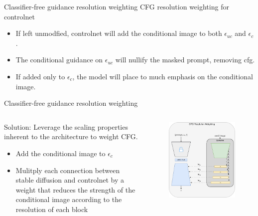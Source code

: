 \documentclass[8pt]{beamer}
\begin{document}
\begin{frame}{Classifier-free guidance resolution weighting}
    CFG resolution weighting for controlnet
    \begin{itemize}
        \item If left unmodfied, controlnet will add the conditional image to both $\epsilon_{uc}$ and $\epsilon_c$.
        \item The conditional guidance on $\epsilon_{uc}$ will nullify the masked prompt, removing cfg.
        \item If added only to $\epsilon_c$, the model will place to much emphasis on the conditional image.
    \end{itemize}
\end{frame}



\begin{frame}{Classifier-free guidance resolution weighting}
    \fontsize{7pt}{7pt}\selectfont
    \begin{columns}
        \begin{column}{.5\textwidth}
            Solution: Leverage the scaling properties inherent to the architecture to weight CFG.
            \begin{itemize}
                \item Add the conditional image to $\epsilon_c$
                \item Mulitply each connection between stable diffusion and controlnet by a weight that reduces the strength of the conditional image according to the resolution of each block
            \end{itemize}
        \end{column}
        \begin{column}{.5\textwidth}
            \begin{figure}
                \includegraphics[scale=0.2]{images/cfg_resolution_weighting}

\end{figure}
\end{column}
\end{columns}
\end{frame}
\end{document}
